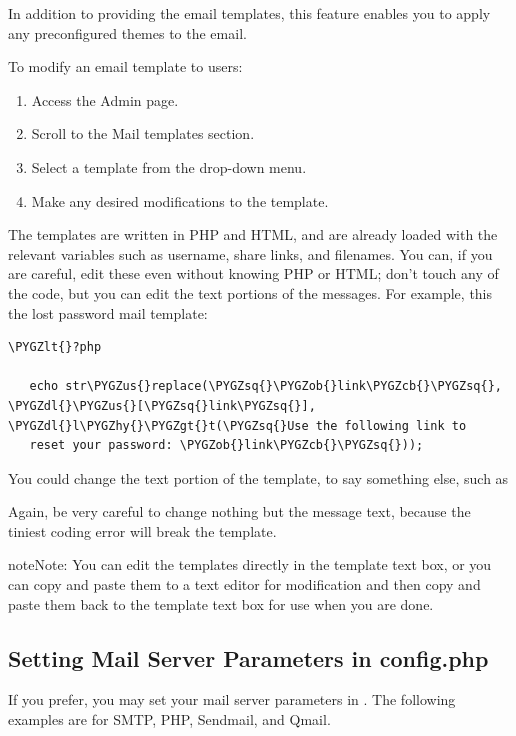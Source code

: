 \documentclass[letterpaper,10pt,english]{sphinxmanual}
\def\PYGZus{\char`\_}
\def\PYGZob{\char`\{}
\def\PYGZcb{\char`\}}
\def\PYGZlt{\char`\<}
\def\PYGZgt{\char`\>}
\def\PYGZdl{\char`\$}
\def\PYGZhy{\char`\-}
\def\PYGZsq{\char`\'}
\begin{document}
In addition to providing the email templates, this feature enables you to apply
any preconfigured themes to the email.

To modify an email template to users:
\begin{enumerate}
\item {} 
Access the Admin page.

\item {} 
Scroll to the Mail templates section.

\item {} 
Select a template from the drop-down menu.

\item {} 
Make any desired modifications to the template.

\end{enumerate}

The templates are written in PHP and HTML, and are already loaded with the
relevant variables such as username, share links, and filenames. You can, if you
are careful, edit these even without knowing PHP or HTML; don't touch any of the
code, but you can edit the text portions of the messages. For example, this the
lost password mail template:

\begin{Verbatim}[commandchars=\\\{\}]
\PYGZlt{}?php

   echo str\PYGZus{}replace(\PYGZsq{}\PYGZob{}link\PYGZcb{}\PYGZsq{}, \PYGZdl{}\PYGZus{}[\PYGZsq{}link\PYGZsq{}], \PYGZdl{}l\PYGZhy{}\PYGZgt{}t(\PYGZsq{}Use the following link to
   reset your password: \PYGZob{}link\PYGZcb{}\PYGZsq{}));
\end{Verbatim}

You could change the text portion of the template,  to say something else, such as 

Again, be very careful to change nothing but the message text, because the
tiniest coding error will break the template.

\begin{notice}{note}{Note:}
You can edit the templates directly in the template text box, or you
can copy and paste them to a text editor for modification and then copy and
paste them back to the template text box for use when you are done.
\end{notice}


\subsection{Setting Mail Server Parameters in config.php}
\label{configuration_server/email_configuration:setting-mail-server-parameters-in-config-php}
If you prefer, you may set your mail server parameters in .
The following examples are for SMTP, PHP, Sendmail, and Qmail.
\end{document}
